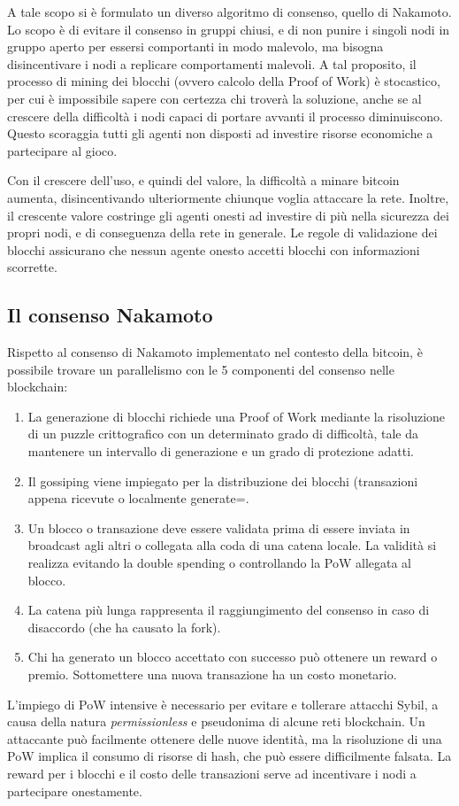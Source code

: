 A tale scopo si è formulato un diverso algoritmo di consenso, quello di Nakamoto. Lo scopo è di evitare il consenso in gruppi chiusi, e di non punire i singoli nodi in gruppo aperto per essersi comportanti in modo malevolo, ma bisogna disincentivare i nodi a replicare comportamenti malevoli. A tal proposito, il processo di mining dei blocchi (ovvero calcolo della Proof of Work) è stocastico, per cui è impossibile sapere con certezza chi troverà la soluzione, anche se al crescere della difficoltà i nodi capaci di portare avvanti il processo diminuiscono. Questo scoraggia tutti gli agenti non disposti ad investire risorse economiche a partecipare al gioco.

Con il crescere dell'uso, e quindi del valore, la difficoltà a minare bitcoin aumenta, disincentivando ulteriormente chiunque voglia attaccare la rete. Inoltre, il crescente valore costringe gli agenti onesti ad investire di più nella sicurezza dei propri nodi, e di conseguenza della rete in generale. Le regole di validazione dei blocchi assicurano che nessun agente onesto accetti blocchi con informazioni scorrette.

\subsection{Il consenso Nakamoto}
Rispetto al consenso di Nakamoto implementato nel contesto della bitcoin, è possibile trovare un parallelismo con le 5 componenti del consenso nelle blockchain:
\begin{enumerate}
    \item La generazione di blocchi richiede una Proof of Work mediante la risoluzione di un puzzle crittografico con un determinato grado di difficoltà, tale da mantenere un intervallo di generazione e un grado di protezione adatti.
    \item Il gossiping viene impiegato per la distribuzione dei blocchi (transazioni appena ricevute o localmente generate=.
    \item Un blocco o transazione deve essere validata prima di essere inviata in broadcast agli altri o collegata alla coda di una catena locale. La validità si realizza evitando la double spending o controllando la PoW allegata al blocco.
    \item La catena più lunga rappresenta il raggiungimento del consenso in caso di disaccordo (che ha causato la fork).
    \item Chi ha generato un blocco accettato con successo può ottenere un reward o premio. Sottomettere una nuova transazione ha un costo monetario.
\end{enumerate}
L'impiego di PoW intensive è necessario per evitare e tollerare attacchi Sybil, a causa della natura \textit{permissionless} e pseudonima di alcune reti blockchain. Un attaccante può facilmente ottenere delle nuove identità, ma la risoluzione di una PoW implica il consumo di risorse di hash, che può essere difficilmente falsata. La reward per i blocchi e il costo delle transazioni serve ad incentivare i nodi a partecipare onestamente.

